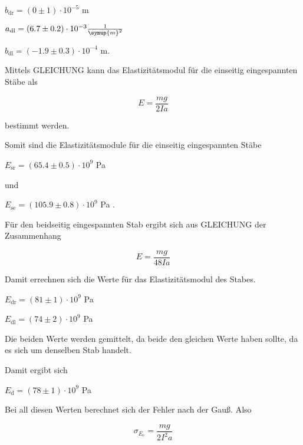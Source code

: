 \centerline{$b_\text{dr} = (0 \pm 1) \cdot 10^{-5} $ m}
\vspace{1em}
\centerline{$a_\text{dl} = (6.7 \pm 0.2) \cdot 10^{-3} \frac{1}{\symup{m}^2} $}

\centerline{$b_\text{dl} = (-1.9 \pm 0.3) \cdot 10^{-4} $ m.}
\vspace{1em}

Mittels GLEICHUNG kann das Elastizitätsmodul für die einseitig eingespannten Stäbe als

\begin{equation}
  E = \frac{m g}{2 I a}
\end{equation}

bestimmt werden.

Somit sind die Elastizitätsmodule für die einseitig eingespannten Stäbe

\vspace{.5em}
\centerline{$E_\text{sr} = (65.4 \pm 0.5) \cdot 10^9$ Pa}
\vspace{.5em}
und
\vspace{.5em}
\centerline{$E_\text{se} = (105.9 \pm 0.8) \cdot 10^9$ Pa .}
\vspace{.5em}
Für den beidseitig eingespannten Stab ergibt sich aus GLEICHUNG der Zusammenhang

\begin{equation}
  E = \frac{m g}{48 I a}
\end{equation}

Damit errechnen sich die Werte für das Elastizitätsmodul des Stabes.

\vspace{.5em}
\centerline{$E_\text{dr}  = (81 \pm 1) \cdot 10^9$ Pa}
\vspace{.5em}

\vspace{.5em}
\centerline{$E_\text{dl}  = (74 \pm 2) \cdot 10^9$ Pa}
\vspace{.5em}

Die beiden Werte werden gemittelt, da beide den gleichen Werte haben sollte, da es sich um denselben Stab handelt.

Damit ergibt sich

\vspace{.5em}
\centerline{$E_\text{d} = (78 \pm 1) \cdot 10^9$ Pa}
\vspace{.5em}

Bei all diesen Werten berechnet sich der Fehler nach der Gauß. Also

\begin{equation}
  \sigma_\text{$E_e$} = \frac{m g}{2 I^2 a}
\end{equation}

